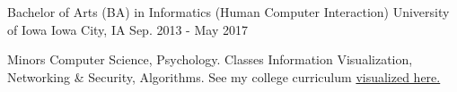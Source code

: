 \begin{cventries}
  \cventry
    {Bachelor of Arts (BA) in Informatics (Human Computer Interaction)}
    {University of Iowa}
    {Iowa City, IA}
    {Sep. 2013 - May 2017}
    {
      \begin{cvitemED}
          \cvskillED
            {Minors}
            {Computer Science, Psychology.}
          \cvskillED
            {Classes}
            {Information Visualization, Networking \& Security, Algorithms.  See my college curriculum \href{https://www.github.com/ryan-p-larson/college-sankey/}{visualized here.}}
      \end{cvitemED}
    }
\end{cventries}
